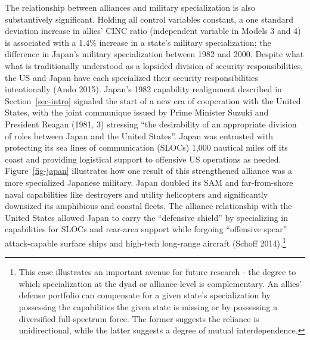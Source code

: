 \documentclass[
  12,
  letterpaper,
  DIV=11,
  numbers=noendperiod]{scrartcl}
\begin{document}
The relationship between alliances and military specialization is also
substantively significant. Holding all control variables constant, a one
standard deviation increase in allies' CINC ratio (independent variable
in Models 3 and 4) is associated with a 1.4\% increase in a state's
military specialization; the difference in Japan's military
specialization between 1982 and 2000. Despite what what is traditionally
understood as a lopsided division of security responsibilities, the US
and Japan have each specialized their security responsibilities
intentionally (Ando 2015). Japan's 1982 capability realignment described
in Section~\ref{sec-intro} signaled the start of a new era of
cooperation with the United States, with the joint communique issued by
Prime Minister Suzuki and President Reagan (1981, 3) stressing ``the
desirability of an appropriate division of roles between Japan and the
United States''. Japan was entrusted with protecting its sea lines of
communication (SLOCs) 1,000 nautical miles off its coast and providing
logistical support to offensive US operations as needed.
Figure~\ref{fig-japan} illustrates how one result of this strengthened
alliance was a more specialized Japanese military. Japan doubled its SAM
and far-from-shore naval capabilities like destroyers and utility
helicopters and significantly downsized its amphibious and coastal
fleets. The alliance relationship with the United States allowed Japan
to carry the ``defensive shield'' by specializing in capabilities for
SLOCs and rear-area support while forgoing ``offensive spear''
attack-capable surface ships and high-tech long-range aircraft (Schoff
2014).\footnote{This case illustrates an important avenue for future
  research - the degree to which specialization at the dyad or
  alliance-level is complementary. An allies' defense portfolio can
  compensate for a given state's specialization by possessing the
  capabilities the given state is missing or by possessing a diversified
  full-spectrum force. The former suggests the reliance is
  unidirectional, while the latter suggests a degree of mutual
  interdependence.}
\end{document}
